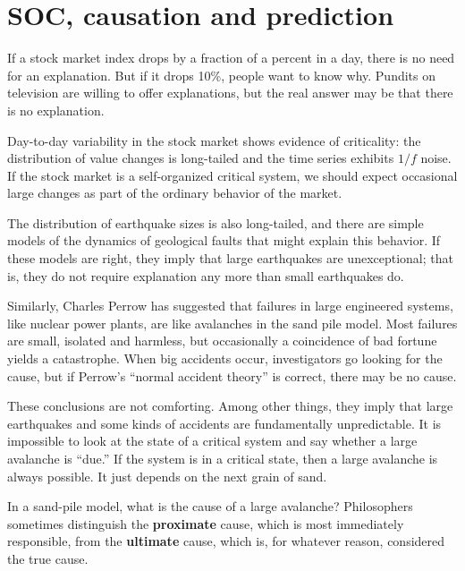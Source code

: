 \documentclass[10pt]{book}
\begin{document}
\section{SOC, causation and prediction}

If a stock market index drops by a fraction of a percent in a
day, there is no need for an explanation.  But if it drops 10\%,
people want to know why.  Pundits
on television are willing to offer explanations, but the real
answer may be that there is no explanation.

Day-to-day variability in the stock market shows evidence of
criticality: the distribution of value changes is long-tailed
and the time series exhibits $1/f$ noise.
If the stock market is a self-organized critical system, we
should expect occasional large changes as part of the ordinary
behavior of the market.

The distribution of earthquake sizes is also long-tailed,
and there are simple models of the dynamics of geological faults
that might explain this behavior.  If these models are right,
they imply that large earthquakes are unexceptional; that is,
they do not require explanation any more than
small earthquakes do.

Similarly, Charles Perrow has suggested that failures in large
engineered systems, like nuclear power plants, are like avalanches
in the sand pile model.  Most failures are small, isolated and
harmless, but occasionally a coincidence of bad fortune yields a
catastrophe.  When big accidents occur, investigators go looking for
the cause, but if Perrow's ``normal accident theory'' is correct,
there may be no cause.

These conclusions are not comforting.  Among other things, they
imply that large earthquakes and some kinds of accidents are
fundamentally unpredictable.  It is impossible to look at the
state of a critical system and say whether a large avalanche
is ``due.''  If the system is in a critical state, then a large
avalanche is always possible.  It just depends on the
next grain of sand.

In a sand-pile model, what is the cause of a large avalanche?
Philosophers sometimes distinguish the {\bf proximate} cause, which is
most immediately responsible, from the {\bf ultimate} cause, which is,
for whatever reason, considered the true cause.
\end{document}
